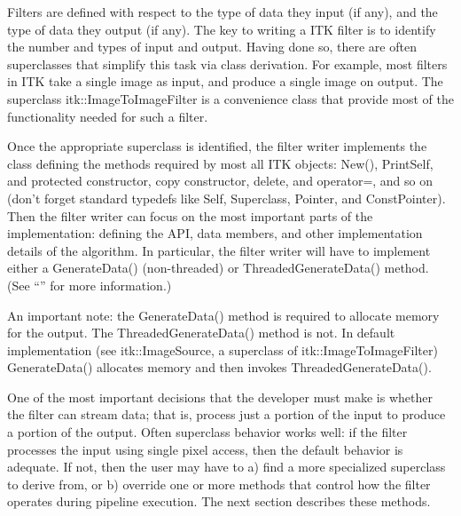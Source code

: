 Filters are defined with respect to the type of data they input (if any), and
the type of data they output (if any). The key to writing a ITK filter is to
identify the number and types of input and output. Having done so, there are
often superclasses that simplify this task via class derivation. For example,
most filters in ITK take a single image as input, and produce a single image
on output. The superclass itk::ImageToImageFilter is a convenience class that
provide most of the functionality needed for such a filter.

Once the appropriate superclass is identified, the filter writer implements
the class defining the methods required by most all ITK objects: New(),
PrintSelf, and protected constructor, copy constructor, delete, and
operator=, and so on (don't forget standard typedefs like Self, Superclass,
Pointer, and ConstPointer). Then the filter writer can focus on the most
important parts of the implementation: defining the API, data members, and
other implementation details of the algorithm. In particular, the filter
writer will have to implement either a GenerateData() (non-threaded) or
ThreadedGenerateData() method. (See ``'' for more information.)

An important note: the GenerateData() method is required to allocate memory
for the output. The ThreadedGenerateData() method is not. In default
implementation (see itk::ImageSource, a superclass of
itk::ImageToImageFilter) GenerateData() allocates memory and then invokes 
ThreadedGenerateData().

One of the most important decisions that the developer must make is whether
the filter can stream data; that is, process just a portion of the input to
produce a portion of the output. Often superclass behavior works well: if the
filter processes the input using single pixel access, then the default
behavior is adequate. If not, then the user may have to a) find a more
specialized superclass to derive from, or b) override one or more methods
that control how the filter operates during pipeline execution. The next
section describes these methods.

\begin{figure}
  \par\centering
  \par
\end{figure}

